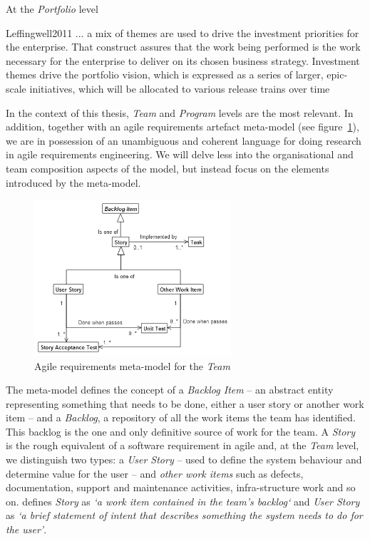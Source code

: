 \documentclass[dissertation,final]{softeng}
\begin{document}
At the \emph{Portfolio} level
\begin{displaycquote}{Leffingwell2011}
... a mix of themes are used to drive the investment priorities for the enterprise. That construct assures that the work being performed is the work necessary for the enterprise to deliver on its chosen business strategy. Investment themes drive the portfolio vision, which is expressed as a series of larger, epic-scale initiatives, which will be allocated to various release trains over time
\end{displaycquote}

In the context of this thesis, \emph{Team} and \emph{Program} levels are the most relevant. In addition, together with an agile requirements artefact meta-model (see figure~\ref{fig:metamodel_partial}), we are in possession of an unambiguous and coherent language for doing research in agile requirements engineering. We will delve less into the organisational and team composition aspects of the model, but instead focus on the elements introduced by the meta-model.

\begin{figure}[h]
\includegraphics[width=0.65\textwidth]{metamodel_partial2}
\centering
\caption{Agile requirements meta-model for the \emph{Team}}
\label{fig:metamodel_partial}
\end{figure}

The meta-model defines the concept of a \emph{Backlog Item} -- an abstract entity representing something that needs to be done, either a user story or another work item -- and a \emph{Backlog}, a repository of all the work items the team has identified. This backlog is the one and only definitive source of work for the team. A \emph{Story} is the rough equivalent of a software requirement in agile and, at the \emph{Team} level, we distinguish two types: a \emph{User Story} -- used to define the system behaviour and determine value for the user -- and \emph{other work items} such as defects, documentation, support and maintenance activities, infra-structure work and so on. \citet{Leffingwell2011} defines \emph{Story} as \emph{`a work item contained in the team's backlog`} and \emph{User Story} as \emph{`a brief statement of intent that describes something the system needs to do for the user'}.
\end{document}

